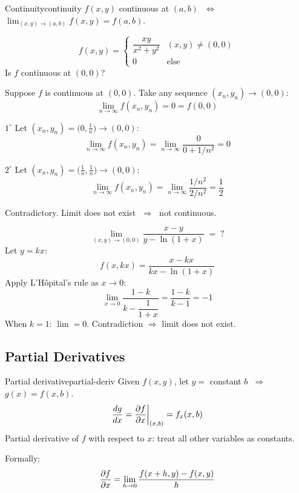 \begin{definition}{Continuity}{continuity}
  $f(x,y)$ continuous at $(a,b)$
  $\;\Longleftrightarrow\;$
  $\displaystyle\lim_{(x,y)\to(a,b)}f(x,y) = f(a,b)$.
\end{definition}

\begin{example}
  \[
    f(x,y) =
    \begin{cases}
      \dfrac{xy}{x^{2}+y^{2}} & (x,y)\neq(0,0) \\[6pt]
      0                       & \text{else}
    \end{cases}
  \]
  Is $f$ continuous at $(0,0)$?

  Suppose $f$ is continuous at $(0,0)$.
  Take any sequence $(x_{n},y_{n})\to(0,0)$:
  \[
    \lim_{n\to\infty}f(x_{n},y_{n}) = 0 = f(0,0)
  \]

  $1^{\circ}$ Let $(x_{n},y_{n})=\bigl(0,\tfrac{1}{n}\bigr)\to(0,0)$:
  \[
    \lim_{n\to\infty}f(x_{n},y_{n})
    = \lim_{n\to\infty}\frac{0}{0+1/n^{2}} = 0
  \]

  $2^{\circ}$ Let $(x_{n},y_{n})=\bigl(\tfrac{1}{n},\tfrac{1}{n}\bigr)\to(0,0)$:
  \[
    \lim_{n\to\infty}f(x_{n},y_{n})
    = \lim_{n\to\infty}\frac{1/n^{2}}{2/n^{2}} = \frac{1}{2}
  \]

  Contradictory. Limit does not exist $\;\Longrightarrow\;$ not continuous.
\end{example}

\begin{example}
  \[
    \lim_{(x,y)\to(0,0)}\frac{x-y}{y-\ln(1+x)} \;=\; ?
  \]
  Let $y=kx$:
  \[
    f(x,kx) = \frac{x-kx}{kx-\ln(1+x)}
  \]
  Apply L'H\^{o}pital's rule as $x\to 0$:
  \[
    \lim_{x\to 0}\frac{1-k}{k-\dfrac{1}{1+x}} = \frac{1-k}{k-1} = -1
  \]
  When $k=1$: $\displaystyle\lim = 0$. \; Contradiction $\Longrightarrow$ limit does not exist.
\end{example}

\subsection{Partial Derivatives}

\begin{definition}{Partial derivative}{partial-deriv}
  Given $f(x,y)$, let $y=$ constant $b$ $\;\Longrightarrow\;$ $g(x)=f(x,b)$.
  \[
    \frac{dg}{dx} = \frac{\partial f}{\partial x}\bigg|_{(x,b)} = f_{x}(x,b)
  \]
  Partial derivative of $f$ with respect to $x$: treat all other variables as constants.

  Formally:
  \[
    \frac{\partial f}{\partial x} = \lim_{h\to 0}\frac{f(x+h,y)-f(x,y)}{h}
  \]
\end{definition}

